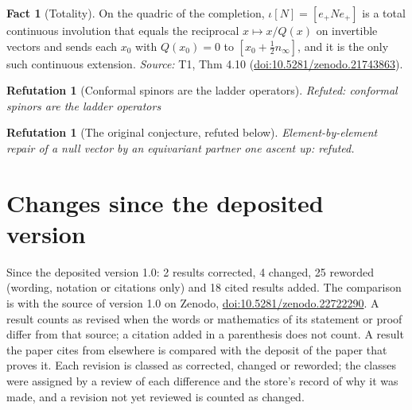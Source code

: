 \documentclass[11pt]{article}
\newtheorem{refutation}[theorem]{Refutation}
\theoremstyle{definition}
\newtheorem{fact}[theorem]{Fact}
\theoremstyle{plain}
\providecommand{\nInf}{}\renewcommand{\nInf}{n_\infty}
\begin{document}
\begin{fact}[Totality]\label{c:transport.totality}
On the quadric of the completion, $\iota[N] = [e_+ N e_+]$ is a total continuous involution that equals the reciprocal $x \mapsto x/Q(x)$ on invertible vectors and sends each $x_0$ with $Q(x_0) = 0$ to $[x_0 + \frac12 \nInf]$, and it is the only such continuous extension.
\emph{Source:} T1, Thm 4.10 (\href{https://doi.org/10.5281/zenodo.21743863}{doi:10.5281/zenodo.21743863}).
\end{fact}

\begin{refutation}[Conformal spinors are the ladder operators]\label{c:refuted.twistors-are-the-ladder-operators}
Refuted: conformal spinors are the ladder operators
\end{refutation}

\begin{refutation}[The original conjecture, refuted below]\label{c:transport.original-conjecture-refuted-below}
Element-by-element repair of a null vector by an equivariant partner one ascent up: refuted.
\end{refutation}

\section*{Changes since the deposited version}
Since the deposited version 1.0: 2 results corrected, 4 changed, 25 reworded (wording, notation or citations only) and 18 cited results added. The comparison is with the source of version 1.0 on Zenodo, \href{https://doi.org/10.5281/zenodo.22722290}{doi:10.5281/zenodo.22722290}. A result counts as revised when the words or mathematics of its statement or proof differ from that source; a citation added in a parenthesis does not count. A result the paper cites from elsewhere is compared with the deposit of the paper that proves it. Each revision is classed as corrected, changed or reworded; the classes were assigned by a review of each difference and the store's record of why it was made, and a revision not yet reviewed is counted as changed.
\end{document}
